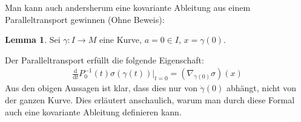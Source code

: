 \documentclass[a4paper]{scrbook}
\numberwithin{equation}{chapter}
\newcommand{\D}{\mathrm{d}}
\theoremstyle{definition}
\newtheorem{lemma}[defn]{Lemma}
\begin{document}
		Man kann auch andersherum eine kovariante Ableitung aus einem Paralleltransport gewinnen (Ohne Beweis):
		\begin{lemma}
			Sei $\gamma\colon I\rightarrow M$ eine Kurve, $a=0\in I$, $x=\gamma(0)$.
			
			Der Paralleltransport erfüllt die folgende Eigenschaft:
			\begin{align*}
				\frac{\D}{\D t} P^{-1}_0(t) \sigma(\gamma(t))\Big\vert_{t=0}=(\nabla_{\dot{\gamma}(0)}\sigma) (x)
			\end{align*}
			Aus den obigen Aussagen ist klar, dass dies nur von $\dot{\gamma}(0)$ abhängt, nicht von der ganzen Kurve. Dies erläutert anschaulich, warum man durch diese Formal auch eine kovariante Ableitung definieren kann.
		\end{lemma}
		
\end{document}
